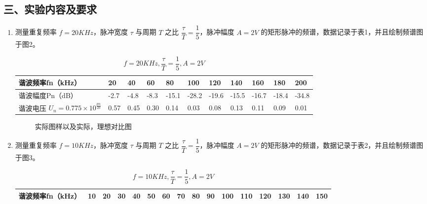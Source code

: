 \documentclass[dvipsnames, svgnames,a4paper,11pt]{article}
\begin{document}
\subsection*{三、实验内容及要求}
\begin{enumerate}
  \item 测量重复频率 $f = 20KHz$，脉冲宽度 $\tau$ 与周期 $T$ 之比 $\dfrac{\tau}{T} = \dfrac{1}{5}$，脉冲幅度 $A = 2V$ 的矩形脉冲的频谱，数据记录于表1，并且绘制频谱图于图2。
  \begin{table}[H]
		\renewcommand\arraystretch{1.7}
		\centering
		\caption{$f = 20KHz, \dfrac{\tau}{T} = \dfrac{1}{5}, A = 2V$}
		\begin{tabularx}{\textwidth}{|p{}|X|X|X|X|X|X|X|X|X|X|}
			\hline
			谐波频率fn（kHz） & 20 & 40 & 60 & 80 & 100 & 120 & 140 & 160 & 180 & 200 \\
			\hline
			谐波幅度Pn（dB） & -2.7 & -4.8 & -8.3 & -15.1 & -28.2 & -19.6 & -15.5 & -16.7 & -18.4 & -34.8 \\
			\hline
      谐波电压 $U_n = 0.775 \times 10^{\frac{pn}{20}}$ & 0.57 & 0.45 & 0.30 & 0.14 & 0.03 & 0.08 & 0.13 & 0.11 & 0.09 & 0.01 \\
			\hline
		\end{tabularx}
	\end{table}
  \begin{figure}[htbp][H]
    \centering
    \caption{实际图样以及实际，理想对比图}
  \end{figure}
  \item 测量重复频率 $f = 10KHz$，脉冲宽度 $\tau$ 与周期 $T$ 之比 $\dfrac{\tau}{T} = \dfrac{1}{5}$，脉冲幅度 $A = 2V$ 的矩形脉冲的频谱，数据记录于表2，并且绘制频谱图于图3。
  \begin{table}[H]
		\renewcommand\arraystretch{1.7}
		\centering
		\caption{$f = 10KHz, \dfrac{\tau}{T} = \dfrac{1}{5}, A = 2V$}
		\begin{tabularx}{\textwidth}{|p{}|p{1.48em}|p{1.48em}|p{1.48em}|X|X|X|X|X|X|X|X|X|X|X|X|}
			\hline
			谐波频率fn（kHz） & 10 & 20 & 30 & 40 & 50 & 60 & 70 & 80 & 90 & 100 & 110 & 120 & 130 & 140 & 150 \\
			\hline
      

\end{tabularx}
\end{table}
\end{enumerate}
\end{document}
